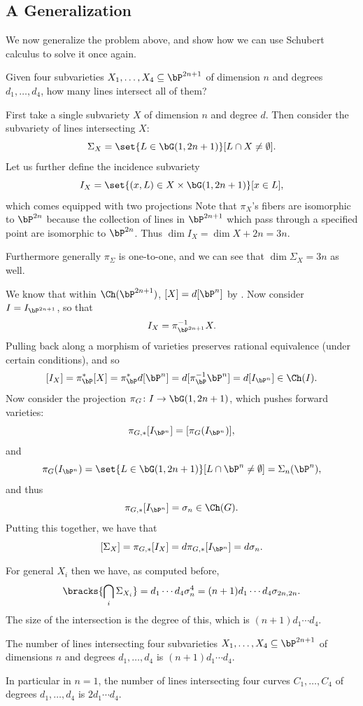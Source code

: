\eansw

\subsection{A Generalization}

We now generalize the problem above, and show how we can use Schubert calculus to solve it once again.

\bprob

    Given four subvarieties $X_1,\dots,X_4\subseteq\bP^{2n+1}$ of dimension $n$ and degrees $d_1,\dots,d_4$,
    how many lines intersect all of them?

\eprob

First take a single subvariety $X$ of dimension $n$ and degree $d$.
Then consider the subvariety of lines intersecting $X$:
$$ \Sigma_X = \set{L\in\bG(1,2n+1)}[L\cap X\neq\emptyset] . $$
Let us further define the incidence subvariety
$$ I_X = \set{(x,L)\in X\times\bG(1,2n+1)}[x\in L] , $$
which comes equipped with two projections
{\def\diagrowheight{0pt}}
Note that $\pi_X$'s fibers are isomorphic to $\bP^{2n}$ because the collection of lines in $\bP^{2n+1}$ which
pass through a specified point are isomorphic to $\bP^{2n}$.
Thus $\dim I_X=\dim X+2n=3n$.

Furthermore generally $\pi_\Sigma$ is one-to-one, and we can see that $\dim\Sigma_X=3n$ as well.

We know that within $\Ch(\bP^{2n+1})$, $[X]=d[\bP^n]$ by .
Now consider $I=I_{\bP^{2n+1}}$, so that
$$ I_X = \pi_{\bP^{2n+1}}^{-1}X . $$
Pulling back along a morphism of varieties preserves rational equivalence (under certain conditions), and so
$$ [I_X] = \pi_\bP^*[X] = \pi_\bP^* d[\bP^n] = d[\pi_\bP^{-1}\bP^n] = d[I_{\bP^n}] \in \Ch(I) . $$
Now consider the projection $\pi_G\colon I\to\bG(1,2n+1)$, which pushes forward varieties:
$$ \pi_{G,*}[I_{\bP^n}] = [\pi_G(I_{\bP^n})] , $$
and
$$ \pi_G(I_{\bP^n}) = \set{L\in\bG(1,2n+1)}[L\cap\bP^n\neq\emptyset] = \Sigma_n(\bP^n) , $$
and thus
$$ \pi_{G,*}[I_{\bP^n}] = \sigma_n \in \Ch(G) . $$
Putting this together, we have that
$$ [\Sigma_X] = \pi_{G,*}[I_X] = d\pi_{G,*}[I_{\bP^n}] = d\sigma_n . $$

For general $X_i$ then we have, as computed before,
$$ \bracks{\bigcap_i\Sigma_{X_i}} = d_1\cdots d_4\sigma_n^4 = (n+1)d_1\cdots d_4\sigma_{2n,2n} . $$
The size of the intersection is the degree of this, which is $(n+1)d_1\cdots d_4$.

\bansw

    The number of lines intersecting four subvarieties $X_1,\dots,X_4\subseteq\bP^{2n+1}$ of dimensions $n$
    and degrees $d_1,\dots,d_4$ is $(n+1)d_1\cdots d_4$.

    In particular in $n=1$, the number of lines intersecting four curves $C_1,\dots,C_4$ of degrees
    $d_1,\dots,d_4$ is $2d_1\cdots d_4$.

\eansw

